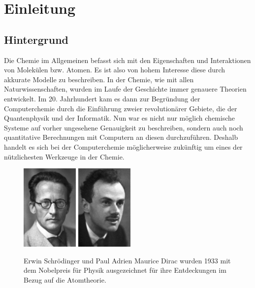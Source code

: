 \chapter{Einleitung}
\section{Hintergrund}
Die Chemie im Allgemeinen befasst sich mit den Eigenschaften und Interaktionen
von Molekülen bzw. Atomen. Es ist also von hohem Interesse diese
durch akkurate Modelle zu beschreiben. In der Chemie, wie mit allen
Naturwissenschaften, wurden im Laufe der Geschichte immer genauere Theorien entwickelt.
Im 20. Jahrhundert kam es dann zur Begründung der Computerchemie durch die Einführung zweier 
revolutionärer Gebiete, die der Quantenphysik und der Informatik.
Nun war es nicht nur möglich chemische Systeme auf vorher ungesehene Genauigkeit zu beschreiben,
sondern auch noch quantitative Berechnungen mit Computern an diesen durchzuführen.
Deshalb handelt es sich bei der Computerchemie möglicherweise zukünftig
um eines der nützlichesten Werkzeuge in der Chemie.

\begin{figure}[h]
    \begin{center}
    \includegraphics[width=0.25\textwidth]{res/schrodinger.jpg}
    \includegraphics[width=0.25\textwidth]{res/dirac.jpg}
\end{center}
    \caption{Erwin Schrödinger und Paul Adrien Maurice Dirac wurden 1933 mit dem Nobelpreis
    für Physik ausgezeichnet für ihre Entdeckungen im Bezug auf die Atomtheorie. \cite{nobel_1933}}
\end{figure}

